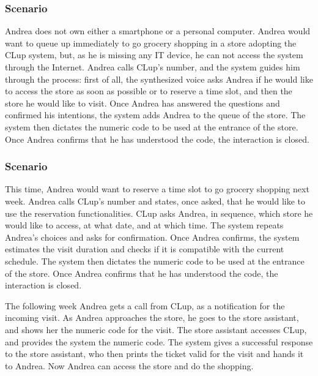 \documentclass[../../main.tex]{subfiles}
\begin{document}
      \subsubsection{Scenario }

        Andrea does not own either a smartphone or a personal computer. 
        Andrea would want to queue up immediately to go grocery shopping in a store adopting the CLup system, 
        but, as he is missing any IT device, he can not access the system through the Internet. 
        Andrea calls CLup's number, and the system guides him through the process: first of all, 
        the synthesized voice asks Andrea if he would like to access the store as soon as possible or to reserve a time slot, 
        and then the store he would like to visit. Once Andrea has answered the questions and confirmed his intentions, 
        the system adds Andrea to the queue of the store. The system then dictates the numeric code to be used at the entrance of the store. 
        Once Andrea confirms that he has understood the code, the interaction is closed.



      \subsubsection{Scenario }

        This time, Andrea would want to reserve a time slot to go grocery shopping next week. 
        Andrea calls CLup's number and states, once asked, that he would like to use the reservation functionalities. 
        CLup asks Andrea, in sequence, which store he would like to access, at what date, and at which time. 
        The system repeats Andrea's choices and asks for confirmation. Once Andrea confirms, 
        the system estimates the visit duration and checks if it is compatible with the current schedule. 
        The system then dictates the numeric code to be used at the entrance of the store. 
        Once Andrea confirms that he has understood the code, the interaction is closed.

        The following week Andrea gets a call from CLup, as a notification for the incoming visit. 
        As Andrea approaches the store, he goes to the store assistant, and shows her the numeric code 
        for the visit.
        The store assistant accesses CLup, and provides the system the numeric code. 
        The system gives a successful response to the store assistant, who then prints the ticket valid 
        for the visit and hands it to Andrea. 
        Now Andrea can access the store and do the shopping.
\end{document}
